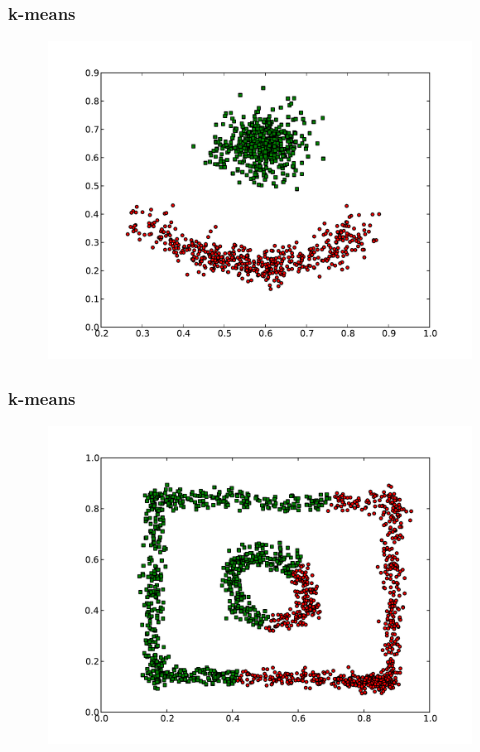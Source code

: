 \documentclass{beamer}
\begin{document}
\begin{frame}
\frametitle{k-means}
    \begin{figure}[]
    \includegraphics[scale=0.3]{kmeans_red-blue-clusters.pdf}
    \end{figure}
\end{frame}

\begin{frame}
\frametitle{k-means}
    \begin{figure}[]
    \includegraphics[scale=0.3]{kmeans_circle-weird.pdf}
    \end{figure}
\end{frame}
\end{document}
